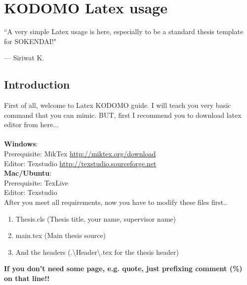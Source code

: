 
\chapter{KODOMO Latex usage} %

\label{Chapter1}

\epigraph{``A very simple Latex usage is here, especially to be a standard thesis template for SOKENDAI!"}{--- \textup{Siriwat K.}}

\section{Introduction}
\label{intro}
First of all, welcome to Latex KODOMO guide. I will teach you very basic command that you can mimic. BUT, first I recommend you to download latex editor from here...\\ \\
\textbf{Windows}:\\
Prerequisite: MikTex \href{http://miktex.org/download}{http://miktex.org/download}\\
Editor: Texstudio \href{http://texstudio.sourceforge.net/}{http://texstudio.sourceforge.net}\\
\textbf{Mac/Ubuntu}:\\
Prerequisite: TexLive\\
Editor: Texstudio\\

\newpage
After you meet all requirements, now you have to modify these files first..\\
\begin{enumerate}
	\item Thesis.cls (Thesis title, your name, supervisor name)\\
	\item main.tex (Main thesis source)\\
	\item And the headers (.\textbackslash Header\textbackslash*.tex for the thesis header)\\
\end{enumerate}

\textbf{If you don't need some page, e.g. quote, just prefixing comment (\%) on that line!!}


